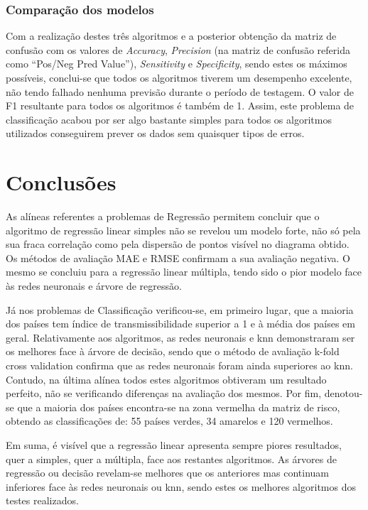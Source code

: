 \documentclass[conference]{IEEEtran}
\begin{document}
\subsubsection{Comparação dos modelos}
Com a realização destes três algoritmos e a posterior obtenção da matriz de confusão com os valores de \textit{Accuracy}, \textit{Precision} (na matriz de confusão referida como “Pos/Neg Pred Value”), \textit{Sensitivity} e \textit{Specificity}, sendo estes os máximos possíveis, conclui-se que todos os algoritmos tiverem um desempenho excelente, não tendo falhado nenhuma previsão durante o período de testagem. O valor de F1 resultante para todos os algoritmos é também de 1.
Assim, este problema de classificação acabou por ser algo bastante simples para todos os algoritmos utilizados conseguirem prever os dados sem quaisquer tipos de erros.



\section{Conclusões} %
As alíneas referentes a problemas de Regressão permitem concluir que o algoritmo de regressão linear simples não se revelou um modelo forte, não só pela sua fraca correlação como pela dispersão de pontos visível no diagrama obtido. Os métodos de avaliação MAE e RMSE confirmam a sua avaliação negativa. O mesmo se concluiu para a regressão linear múltipla, tendo sido o pior modelo face às redes neuronais e árvore de regressão. 

Já nos problemas de Classificação verificou-se, em primeiro lugar, que a maioria dos países tem índice de transmissibilidade superior a 1 e à média dos países em geral. Relativamente aos algoritmos, as redes neuronais e knn demonstraram ser os melhores face à árvore de decisão, sendo que o método de avaliação k-fold cross validation confirma que as redes neuronais foram ainda superiores ao knn. Contudo, na última alínea todos estes algoritmos obtiveram um resultado perfeito, não se verificando diferenças na avaliação dos mesmos. Por fim, denotou-se que a maioria dos países encontra-se na zona vermelha da matriz de risco, obtendo as classificações de: 55 países verdes, 34 amarelos e 120 vermelhos. 

Em suma, é visível que a regressão linear apresenta sempre piores resultados, quer a simples, quer a múltipla, face aos restantes algoritmos. As árvores de regressão ou decisão revelam-se melhores que os anteriores mas continuam inferiores face às redes neuronais ou knn, sendo estes os melhores algoritmos dos testes realizados. 
\end{document}
